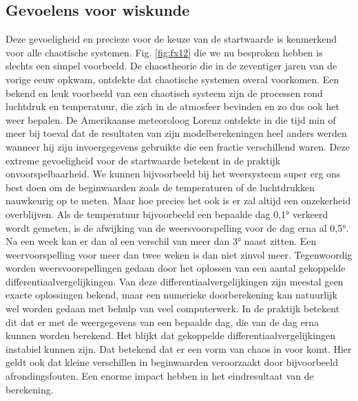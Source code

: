 \documentclass[11pt,fleqn]{book} %
\begin{document}
\subsection{Gevoelens voor wiskunde}
Deze gevoeligheid en precieze voor de keuze van de startwaarde is kenmerkend voor alle chaotische systemen. Fig. \ref{fig:fx12} die we nu besproken hebben is slechts een simpel voorbeeld. De chaostheorie die in de zeventiger jaren van de vorige eeuw opkwam, ontdekte dat chaotische systemen overal voorkomen. Een bekend en leuk voorbeeld van een chaotisch systeem zijn de processen rond luchtdruk en temperatuur, die zich in de atmosfeer bevinden en zo dus ook het weer bepalen. De Amerikaanse meteoroloog Lorenz ontdekte in die tijd min of meer bij toeval dat de resultaten van zijn modelberekeningen heel anders werden wanneer hij  zijn invoergegevens gebruikte die een fractie verschillend waren. Deze extreme gevoeligheid voor de startwaarde betekent in de praktijk onvoorspelbaarheid. We kunnen bijvoorbeeld bij het weersysteem super erg ons best doen om de beginwaarden zoals de temperaturen of de luchtdrukken nauwkeurig op te meten. Maar hoe precies het ook is er zal altijd een onzekerheid overblijven. Als de temperatuur bijvoorbeeld een bepaalde dag 0,1° verkeerd wordt gemeten, is de afwijking van de weersvoorspelling voor de dag erna al 0,5°. Na een week kan er dan al een verschil van meer dan 3° naast zitten. Een weervoorspelling voor meer dan twee weken is dan niet zinvol meer. Tegenwoordig worden weersvoorspellingen gedaan door het oplossen van een aantal gekoppelde differentiaalvergelijkingen. Van deze differentiaalvergelijkingen zijn meestal geen exacte oplossingen bekend, maar een numerieke doorberekening kan natuurlijk wel worden gedaan met behulp van veel computerwerk. In de praktijk betekent dit dat er met de weergegevens van een bepaalde dag, die van de dag erna kunnen worden berekend. Het blijkt dat gekoppelde differentiaalvergelijkingen instabiel kunnen zijn. Dat betekend dat er een vorm van chaos in voor komt. Hier geldt ook dat kleine verschillen in beginwaarden veroorzaakt door bijvoorbeeld afrondingsfouten. Een enorme impact hebben in het eindresultaat van de berekening.
\end{document}
